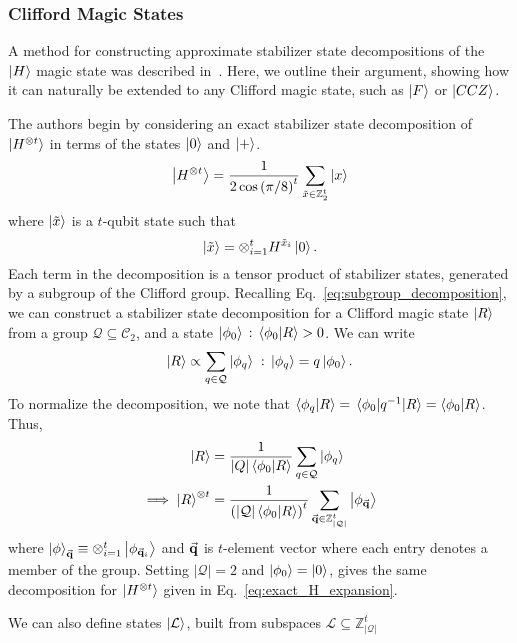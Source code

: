 \subsubsection*{Clifford Magic States}
A method for constructing approximate stabilizer state decompositions of the $\ket{H}$ magic state was described in~\cite{Bravyi2016}. Here, we outline their argument, showing how it can naturally be extended to any Clifford magic state, such as $\ket{F}$ or $\ket{CCZ}$.\par
The authors begin by considering an exact stabilizer state decomposition of $\ket{H^{\otimes t}}$ in terms of the states $\ket{0}$ and $\ket{+}$.
\begin{equation}
\ket{H^{\otimes t}} = \frac{1}{2\cos\left(\pi/8\right)^{t}}\sum_{\tilde{x}\in\mathbb{Z}_{2}^{t}} \ket{x}
\label{eq:exact_H_expansion}
\end{equation}
where $\ket{\tilde{x}}$ is a $t$-qubit state such that
\begin{equation}
\ket{\tilde{x}}=\otimes_{i=1}^{t} H^{\tilde{x}_{i}}\ket{0}
\label{eq:xtilde_bits}.
\end{equation}
Each term in the decomposition is a tensor product of stabilizer states, generated by a subgroup of the Clifford group. Recalling Eq.~\ref{eq:subgroup_decomposition}, we can construct a stabilizer state decomposition for a Clifford magic state $\ket{R}$ from a group $\mathcal{Q}\subseteq \mathcal{C}_{2}$, and a state $\ket{\phi_{0}}\,:\,\braket{\phi_{0}}{R}>0$. We can write
\[\ket{R}\propto \sum_{q\in\mathcal{Q}}\ket{\phi_{q}} \;:\,\ket{\phi_{q}}=q\ket{\phi_{0}}.\]
To normalize the decomposition, we note that $\braket{\phi_{q}}{R}=\matrixel{\phi_{0}}{q^{-1}}{R}=\braket{\phi_{0}}{R}$. Thus, 
\begin{align}
\ket{R}& =\frac{1}{\left|Q\right|\braket{\phi_{0}}{R}}\sum_{q\in\mathcal{Q}}\ket{\phi_{q}} \nonumber \\
\implies \ket{R}^{\otimes t}&=\frac{1}{\left(\left|\mathcal{Q}\right|\braket{\phi_{0}}{R}\right)^{t}}\sum_{\va{q}\in\mathbb{Z}_{\left|\mathcal{Q}\right|}^{t}}\ket{\phi_{\va{q}}}
\label{eq:clifford_sym_decomposition}
\end{align}
where $\ket{\phi}_{\va{q}}\equiv\otimes_{i=1}^{t}\ket{\phi_{\va{q}_{i}}}$ and $\va{q}$ is $t$-element vector where each entry denotes a member of the group. Setting $\left|\mathcal{Q}\right|=2$ and $\ket{\phi_{0}}=\ket{0}$, gives the same decomposition for $\ket{H^{\otimes t}}$ given in Eq.~\ref{eq:exact_H_expansion}.\par
We can also define states $\ket{\mathcal{L}}$, built from subspaces $\mathcal{L}\subseteq\mathbb{Z}_{\left|\mathcal{Q}\right|}^{t}$
